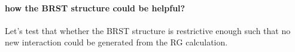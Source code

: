 
\paragraph{how the BRST structure could be helpful?}

Let's test that whether the BRST structure is restrictive enough such that no new interaction could be generated from the RG calculation.
